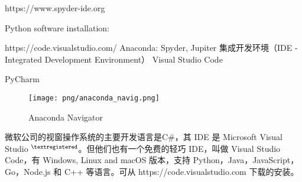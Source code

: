 \documentclass[main.tex]{subfiles}
\begin{document}
	
https://www.spyder-ide.org

Python software installation:

https://code.visualstudio.com/
Anaconda: Spyder, Jupiter
集成开发环境（IDE - Integrated Development Environment）
Visual Studio Code

PyCharm

\begin{figure}[h]
	\centering
	\texttt{[image: png/anaconda\_navig.png]}
	\caption{Anaconda Navigator}
	\label{fig:III.1.3}
\end{figure}


微软公司的视窗操作系统的主要开发语言是C\#，其 IDE 是 Microsoft Visual Studio ${}^{\textregistered}$。但他们也有一个免费的轻巧 IDE，叫做 Visual Studio Code，有 Windows, Linux and macOS 版本，支持 Python，Java，JavaScript，Go，Node.js 和 C++ 等语言。可从
https://code.visualstudio.com
下载的安装。
\end{document}
